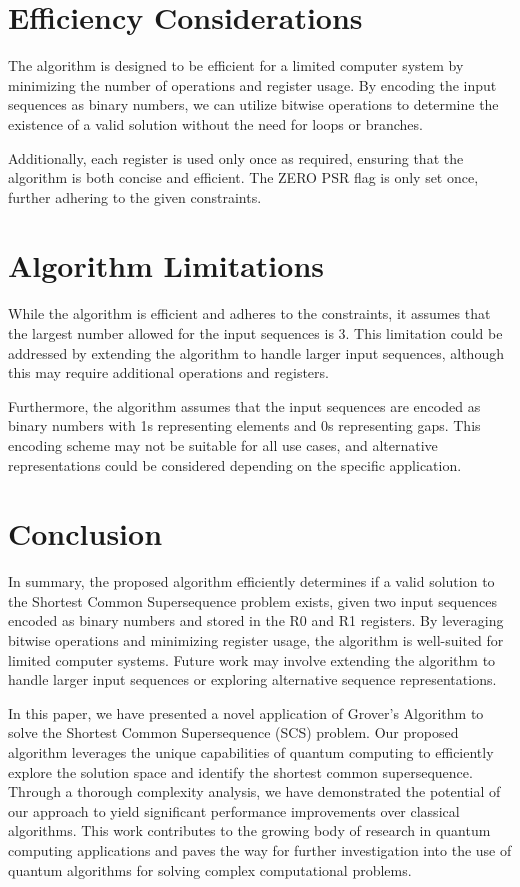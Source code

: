 \section{Efficiency Considerations}
The algorithm is designed to be efficient for a limited computer system by minimizing the number of operations and register usage. By encoding the input sequences as binary numbers, we can utilize bitwise operations to determine the existence of a valid solution without the need for loops or branches.

Additionally, each register is used only once as required, ensuring that the algorithm is both concise and efficient. The ZERO PSR flag is only set once, further adhering to the given constraints.

\section{Algorithm Limitations}
While the algorithm is efficient and adheres to the constraints, it assumes that the largest number allowed for the input sequences is 3. This limitation could be addressed by extending the algorithm to handle larger input sequences, although this may require additional operations and registers.

Furthermore, the algorithm assumes that the input sequences are encoded as binary numbers with 1s representing elements and 0s representing gaps. This encoding scheme may not be suitable for all use cases, and alternative representations could be considered depending on the specific application.

\section{Conclusion}
In summary, the proposed algorithm efficiently determines if a valid solution to the Shortest Common Supersequence problem exists, given two input sequences encoded as binary numbers and stored in the R0 and R1 registers. By leveraging bitwise operations and minimizing register usage, the algorithm is well-suited for limited computer systems. Future work may involve extending the algorithm to handle larger input sequences or exploring alternative sequence representations.

In this paper, we have presented a novel application of Grover's Algorithm to solve the Shortest Common Supersequence (SCS) problem. Our proposed algorithm leverages the unique capabilities of quantum computing to efficiently explore the solution space and identify the shortest common supersequence. Through a thorough complexity analysis, we have demonstrated the potential of our approach to yield significant performance improvements over classical algorithms. This work contributes to the growing body of research in quantum computing applications and paves the way for further investigation into the use of quantum algorithms for solving complex computational problems.

